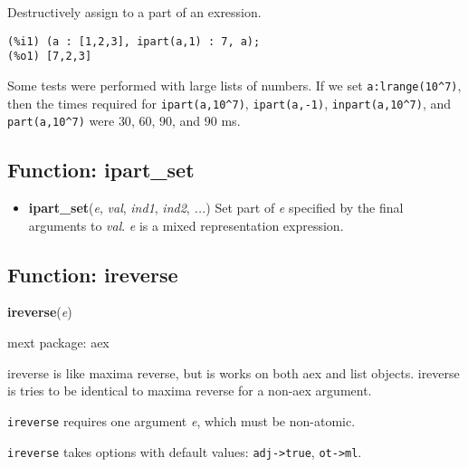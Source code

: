 \documentclass[]{article}
\begin{document}
   Destructively assign to a part of an exression. 

\begin{Verbatim}[frame=single]
(%i1) (a : [1,2,3], ipart(a,1) : 7, a);
(%o1) [7,2,3]
\end{Verbatim}


Some tests were performed with large lists of numbers. If we set \verb#a:lrange(10^7)#, then the times required for \verb#ipart(a,10^7)#, \verb#ipart(a,-1)#, \verb#inpart(a,10^7)#, and \verb#part(a,10^7)# were $30$, $60$, $90$, and $90$ ms. 

\vspace{5 pt}


\subsection{Function: ipart\_set\label{sec:ipart_set}}
\hypertarget{ipart_set}{}



\vspace{5 pt}
\begin{itemize}
\item[] {\bf ipart\_set}({\it e}, {\it val}, {\it ind1}, {\it ind2}, {\it ...})
  Set part of {\it e} specified by the final arguments to {\it val}. {\it e} is a mixed representation expression. 

\end{itemize}

\subsection{Function: ireverse\label{sec:ireverse}}
\hypertarget{ireverse}{}
{\bf ireverse}({\it e})


\noindent mext package: aex



\vspace{5 pt}
ireverse is like maxima reverse, but is works on both aex and list objects. ireverse is tries to be identical to maxima reverse for a non-aex argument. 

\vspace{5 pt}

   {\tt ireverse} requires one argument {\it e}, which must be non-atomic.


\vspace{5 pt}

{\tt ireverse} takes options with default values: {\tt adj->true}, {\tt ot->ml}.
\vspace{5 pt}
\end{document}
